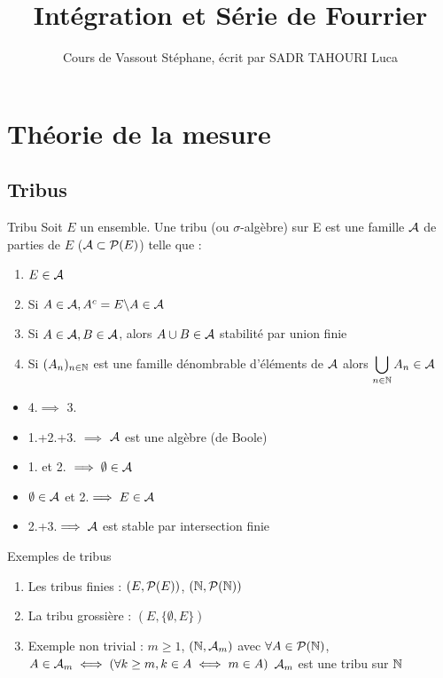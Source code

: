 \documentclass[]{report}
\title{Intégration et Série de Fourrier}
\author{Cours de Vassout Stéphane, écrit par SADR TAHOURI Luca}
\date{}
\begin{document}
    \maketitle
    \tableofcontents

\chapter{Théorie de la mesure}

\section{Tribus}

\begin{df}{Tribu}{}
    Soit $E$ un ensemble. Une tribu (ou $\sigma$-algèbre) sur E est une famille $\mathcal{A}$ de parties de $E$ ($\mathcal{A}\subset \mathcal{P}(E)$) telle que :
    \begin{enumerate}
        \item $E\in \mathcal{A}$
        \item Si $A\in \mathcal{A},A^c=E\backslash A\in \mathcal{A}$
        \item Si $A\in \mathcal{A},B\in \mathcal{A}$, alors $A\cup B\in \mathcal{A}$ stabilité par union finie
        \item Si $(A_n)_{n\in\mathbb{N}}$ est une famille dénombrable d'éléments de $\mathcal{A}$ alors $\displaystyle{\bigcup_{n\in\mathbb{N}}A_n \in \mathcal{A}}$
    \end{enumerate}
\end{df}

\begin{re}{}{}
    \begin{itemize}
        \item 4.$\implies$ 3.
        \item 1.+2.+3. $\implies$ $\mathcal{A}$ est une algèbre (de Boole)
        \item 1. et 2. $\implies \emptyset\in\mathcal{A}$
        \item $\emptyset\in\mathcal{A}$ et 2.$\implies E\in \mathcal{A}$
        \item 2.+3.$\implies \mathcal{A}$ est stable par intersection finie
    \end{itemize}
\end{re}

\begin{ex}{Exemples de tribus}{}
\begin{enumerate}
    \item Les tribus finies : $(E,\mathcal{P}(E))$, $(\mathbb{N},\mathcal{P}(\mathbb{N}))$
    \item La tribu grossière : $(E,\{\emptyset,E\})$
    \item Exemple non trivial :
    $m\ge1$, $(\mathbb{N},\mathcal{A}_m)$ avec $\forall A\in \mathcal{P}(\mathbb{N})$, $A\in\mathcal{A}_m \iff(\forall k\ge m,k\in A\iff m\in A)$
    $\mathcal{A}_m$ est une tribu sur $\mathbb{N}$
\end{enumerate}
\end{ex}
\end{document}
